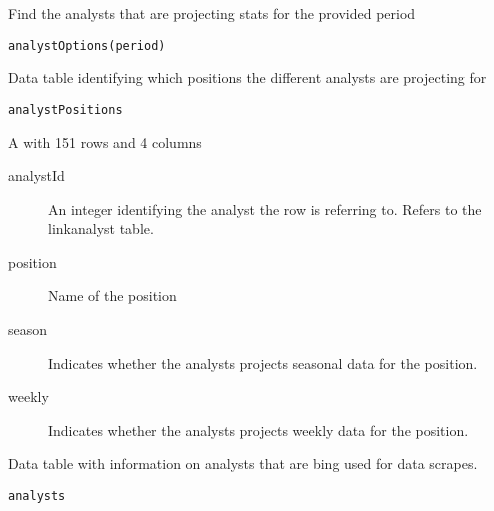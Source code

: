 \documentclass[a4paper]{book}
\begin{document}
%
\begin{Description}\relax
Find the analysts that are projecting stats for the provided period
\end{Description}
%
\begin{Usage}
\begin{verbatim}
analystOptions(period)
\end{verbatim}
\end{Usage}
%
\begin{Description}\relax
Data table identifying which positions the different analysts are projecting
for
\end{Description}
%
\begin{Usage}
\begin{verbatim}
analystPositions
\end{verbatim}
\end{Usage}
%
\begin{Format}
A  with 151 rows and 4 columns
\begin{description}

\item[analystId] An integer identifying the analyst the row is referring to.
Refers to the linkanalyst table.
\item[position] Name of the position
\item[season] Indicates whether the analysts projects seasonal data for the
position.
\item[weekly] Indicates whether the analysts projects weekly data for the
position.

\end{description}
\end{Format}
%
\begin{Description}\relax
Data table with information on analysts that are bing used for data scrapes.
\end{Description}
%
\begin{Usage}
\begin{verbatim}
analysts
\end{verbatim}
\end{Usage}
%
\end{document}
